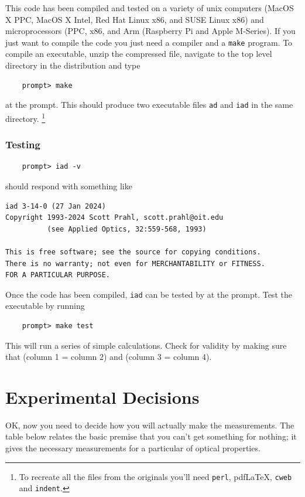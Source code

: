 \documentclass{article}
\newcommand\pdflatex{pdf\LaTeX}
\newcommand\iadprog{\texttt{iad}}
\begin{document}
This code has been compiled and tested on a variety of unix computers (MacOS X PPC, MacOS X Intel,
Red Hat Linux x86, and SUSE Linux x86) and microprocessors (PPC, x86, and Arm (Raspberry Pi and
Apple M-Series).
If you just want to compile the code you just need a compiler and a \texttt{make} program.
To compile an executable,  unzip the compressed file, navigate to the top level directory in the distribution and type
\begin{verbatim}
    prompt> make
\end{verbatim}
at the prompt.  This should produce two executable files \texttt{ad} and \iadprog{} in the 
same directory.%
\footnote{To recreate all the files
from the originals you'll need \texttt{perl}, \pdflatex{}, \texttt{cweb} and \texttt{indent}.}

\subsubsection{Testing}
\begin{verbatim}
    prompt> iad -v
\end{verbatim}
should respond with something like
\begin{verbatim}
iad 3-14-0 (27 Jan 2024)
Copyright 1993-2024 Scott Prahl, scott.prahl@oit.edu
          (see Applied Optics, 32:559-568, 1993)

This is free software; see the source for copying conditions.
There is no warranty; not even for MERCHANTABILITY or FITNESS.
FOR A PARTICULAR PURPOSE.
\end{verbatim}

Once the code has been compiled, \iadprog{} can be tested by
at the prompt.  Test the executable by running
\begin{verbatim}
    prompt> make test
\end{verbatim}
This will run a series of simple calculations.  Check for validity by making sure
that (column 1 = column 2) and (column 3 = column 4).

\clearpage

\section{Experimental Decisions}

OK, now you need to decide how you will actually make the measurements. The table
below relates the basic premise that you can't get something for nothing; it gives
the necessary measurements for a particular of optical properties.
\end{document}
